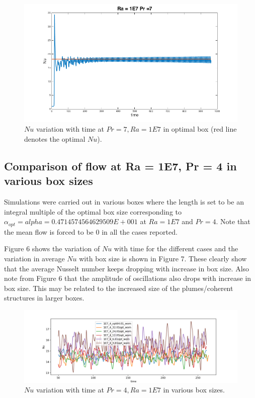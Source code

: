 \documentclass[12pt]{article}
\begin{document}
      \begin{figure}[!htb]
      	\includegraphics[width=\linewidth]{Nu1E77opt.png}
      	\caption{$Nu$ variation with time at $Pr = 7, Ra = 1E7$ in optimal box (red line denotes the optimal $Nu$).}
      	\label{fig:fig5}
      \end{figure}  
      
      \subsection{Comparison of flow at Ra = 1E7, Pr = 4 in various box sizes}
      
      Simulations were carried out in various boxes where the length is set to be an integral multiple of the optimal box size corresponding to $\alpha_{opt} = alpha = 0.4714574564629509E+001$ at $Ra = 1E7$ and $Pr = 4$. Note that the mean flow is forced to be 0 in all the cases reported.
      
      Figure 6 shows the variation of $Nu$ with time for the different cases and the variation in average $Nu$ with box size is shown in Figure 7. These clearly show that the average Nusselt number keeps dropping with increase in box size. Also note from Figure 6 that the amplitude of oscillations also drops with increase in box size. This may be related to the increased size of the plumes/coherent structures in larger boxes.
      
      \begin{figure}[!htb]
      	\includegraphics[width=\linewidth]{Nu_1E7_4.png}
      	\caption{$Nu$ variation with time at $Pr = 4, Ra = 1E7$ in various box sizes.}
      	\label{fig:fig6}
      \end{figure} 
      
\end{document}
